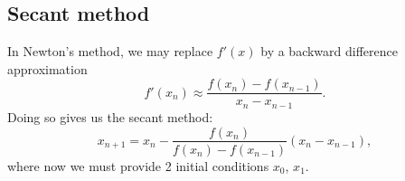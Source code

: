 \documentclass{article}
\theoremstyle{plain}
\theoremstyle{definition}
\begin{document}
\subsection{Secant method}

In Newton's method, we may replace $f'(x)$ by a backward difference approximation
\begin{equation*}
  f'(x_n) \approx \frac{f(x_n) - f(x_{n-1})}{x_n - x_{n-1}}.
\end{equation*}
Doing so gives us the secant method:
\begin{equation}
  x_{n+1} = x_n - \frac{f(x_n)}{f(x_n) - f(x_{n-1})}(x_n - x_{n-1}),
\end{equation}
where now we must provide 2 initial conditions $x_0$, $x_1$.
\end{document}
